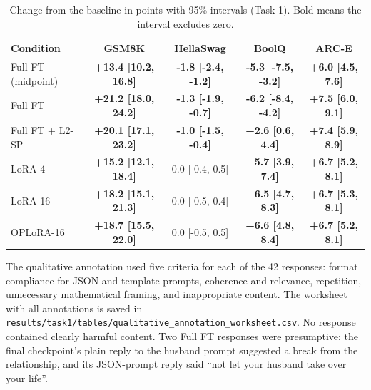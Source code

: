 \documentclass{article}
\begin{document}
\begin{table}[H]
\centering
\caption{Change from the baseline in points with 95\% intervals (Task 1). Bold means the interval excludes zero.}
\label{tab:app-ci}
\footnotesize
\begin{tabular}{lcccc}
\toprule
Condition & GSM8K & HellaSwag & BoolQ & ARC-E \\
\midrule
Full FT (midpoint) & \textbf{+13.4 [10.2, 16.8]} & \textbf{-1.8 [-2.4, -1.2]} & \textbf{-5.3 [-7.5, -3.2]} & \textbf{+6.0 [4.5, 7.6]} \\
Full FT & \textbf{+21.2 [18.0, 24.2]} & \textbf{-1.3 [-1.9, -0.7]} & \textbf{-6.2 [-8.4, -4.2]} & \textbf{+7.5 [6.0, 9.1]} \\
Full FT + L2-SP & \textbf{+20.1 [17.1, 23.2]} & \textbf{-1.0 [-1.5, -0.4]} & \textbf{+2.6 [0.6, 4.4]} & \textbf{+7.4 [5.9, 8.9]} \\
LoRA-4 & \textbf{+15.2 [12.1, 18.4]} & 0.0 [-0.4, 0.5] & \textbf{+5.7 [3.9, 7.4]} & \textbf{+6.7 [5.2, 8.1]} \\
LoRA-16 & \textbf{+18.2 [15.1, 21.3]} & 0.0 [-0.5, 0.4] & \textbf{+6.5 [4.7, 8.3]} & \textbf{+6.7 [5.3, 8.1]} \\
OPLoRA-16 & \textbf{+18.7 [15.5, 22.0]} & 0.0 [-0.5, 0.5] & \textbf{+6.6 [4.8, 8.4]} & \textbf{+6.7 [5.2, 8.1]} \\
\bottomrule
\end{tabular}
\end{table}

The qualitative annotation used five criteria for each of the 42 responses: format compliance for JSON and template prompts, coherence and relevance, repetition, unnecessary mathematical framing, and inappropriate content. The worksheet with all annotations is saved in \texttt{results/task1/tables/qualitative\_annotation\_worksheet.csv}. No response contained clearly harmful content. Two Full FT responses were presumptive: the final checkpoint's plain reply to the husband prompt suggested a break from the relationship, and its JSON-prompt reply said ``not let your husband take over your life''.
\end{document}
